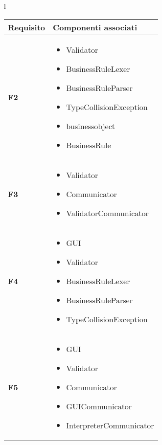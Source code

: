 \large{
\begin{tabular}{l}
\begin{tabular}{||p{3cm}||p{9cm}||} \hline
\textbf{Requisito} & {Componenti associati} \\ \hline
\textbf{F2} & 
\begin{itemize}
\item Validator
\item BusinessRuleLexer
\item BusinessRuleParser
\item TypeCollisionException
\item businessobject
\item BusinessRule
\end{itemize} \\ \hline
\textbf{F3} &
\begin{itemize}
\item Validator
\item Communicator
\item ValidatorCommunicator
\end{itemize} \\ \hline
\textbf{F4} & 
\begin{itemize}
\item GUI
\item Validator
\item BusinessRuleLexer
\item BusinessRuleParser
\item TypeCollisionException
\end{itemize} \\ \hline
\textbf{F5} &
\begin{itemize}
\item GUI
\item Validator
\item Communicator
\item GUICommunicator
\item InterpreterCommunicator
\end{itemize} \\ \hline
\end{tabular} \\
\end{tabular}
}

